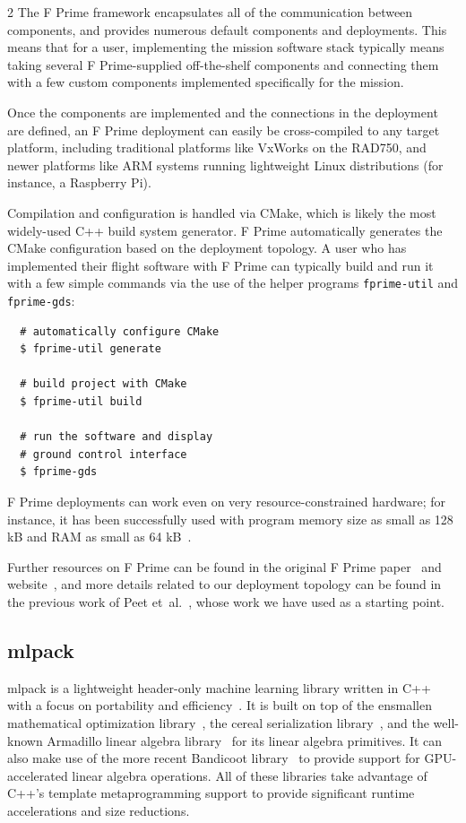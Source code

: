 \documentclass[10pt, fleqn]{article}
\begin{document}
\begin{multicols*}{2}
The F Prime framework encapsulates all of the communication between components,
and provides numerous default components and deployments.
This means that for a user,
implementing the mission software stack
typically means taking several F Prime-supplied off-the-shelf components
and connecting them with a few custom components
implemented specifically for the mission.

Once the components are implemented
and the connections in the deployment are defined,
an F Prime deployment can easily be cross-compiled to any target platform,
including traditional platforms like VxWorks on the RAD750,
and newer platforms like ARM systems running lightweight Linux distributions
(for instance, a Raspberry Pi).

Compilation and configuration is handled via
CMake, which is likely the most widely-used C++ build system generator.
F Prime automatically generates the CMake configuration
based on the deployment topology.
A user who has implemented their flight software with F Prime
can typically build and run it with a few simple commands
via the use of the helper programs {\small \tt fprime-util} and {\small \tt fprime-gds}:

\begin{verbatim}
  # automatically configure CMake
  $ fprime-util generate

  # build project with CMake
  $ fprime-util build

  # run the software and display
  # ground control interface
  $ fprime-gds
\end{verbatim}

F Prime deployments can work even on very resource-constrained hardware;
for instance,
it has been successfully used with program memory size as small as 128 kB
and RAM as small as 64 kB~\cite{Kolhof2021,Cheek2021}.

Further resources on F Prime can be found
in the original F Prime paper~\cite{bocchino2018f}
and website~\cite{fprimewebsite},
and more details related to our deployment topology can be found
in the previous work of Peet et~al.~\cite{peet2024framework},
whose work we have used as a starting point.

\subsection{mlpack}

mlpack is a lightweight header-only machine learning library
written in C++ with a focus on portability and efficiency~\cite{mlpack2023}.
It is built on top of the
ensmallen mathematical optimization library~\cite{curtin2021ensmallen},
the cereal serialization library~\cite{grant2017cereal},
and the well-known Armadillo linear algebra library~\cite{sanderson2016armadillo}
for its linear algebra primitives.
It can also make use of the more recent Bandicoot library~\cite{curtin2026fast}
to provide support for GPU-accelerated linear algebra operations.
All of these libraries take advantage of
C++'s template metaprogramming support
to provide significant runtime accelerations and
size reductions.


\end{multicols*}
\end{document}
